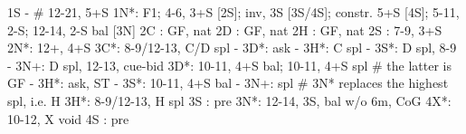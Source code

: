 1S -  # 12-21, 5+S
1N*: F1; 4-6, 3+S [2S]; inv, 3S [3S/4S]; constr. 5+S [4S]; 5-11, 2-S; 12-14, 2-S bal [3N]
2C : GF, nat
2D : GF, nat
2H : GF, nat
2S : 7-9, 3+S
2N*: 12+, 4+S
3C*: 8-9/12-13, C/D spl
   - 3D*: ask
        - 3H*: C spl
        - 3S*: D spl, 8-9
        - 3N+: D spl, 12-13, cue-bid
3D*: 10-11, 4+S bal; 10-11, 4+S spl  # the latter is GF
   - 3H*: ask, ST
        - 3S*: 10-11, 4+S bal
        - 3N+: spl  # 3N* replaces the highest spl, i.e. H
3H*: 8-9/12-13, H spl
3S : pre
3N*: 12-14, 3S, bal w/o 6m, CoG
4X*: 10-12, X void
4S : pre